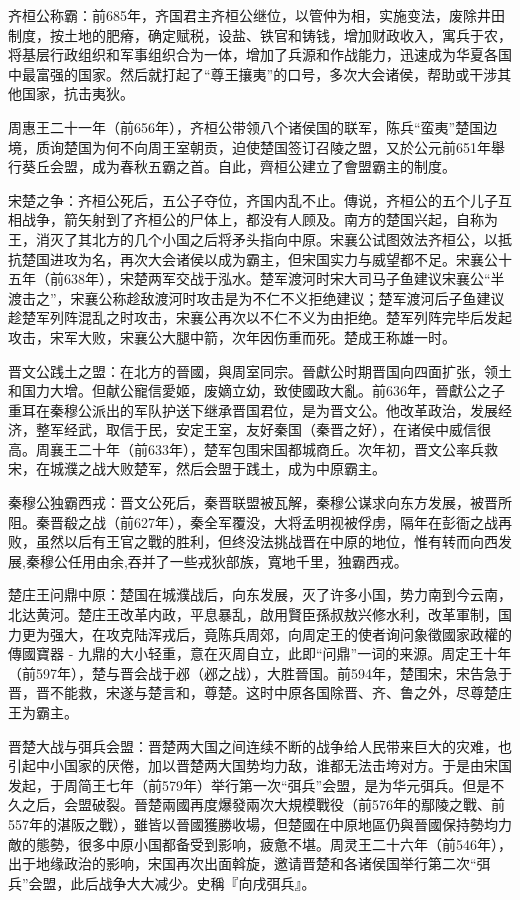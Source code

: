齐桓公称霸：前685年，齐国君主齐桓公继位，以管仲为相，实施变法，废除井田制度，按土地的肥瘠，确定赋税，设盐、铁官和铸钱，增加财政收入，寓兵于农，将基层行政组织和军事组织合为一体，增加了兵源和作战能力，迅速成为华夏各国中最富强的国家。然后就打起了“尊王攘夷”的口号，多次大会诸侯，帮助或干涉其他国家，抗击夷狄。

周惠王二十一年（前656年），齐桓公带领八个诸侯国的联军，陈兵“蛮夷”楚国边境，质询楚国为何不向周王室朝贡，迫使楚国签订召陵之盟，又於公元前651年舉行葵丘会盟，成为春秋五霸之首。自此，齊桓公建立了會盟霸主的制度。

宋楚之争：齐桓公死后，五公子夺位，齐国内乱不止。傳说，齐桓公的五个儿子互相战争，箭矢射到了齐桓公的尸体上，都没有人顾及。南方的楚国兴起，自称为王，消灭了其北方的几个小国之后将矛头指向中原。宋襄公试图效法齐桓公，以抵抗楚国进攻为名，再次大会诸侯以成为霸主，但宋国实力与威望都不足。宋襄公十五年（前638年），宋楚两军交战于泓水。楚军渡河时宋大司马子鱼建议宋襄公“半渡击之”，宋襄公称趁敌渡河时攻击是为不仁不义拒绝建议；楚军渡河后子鱼建议趁楚军列阵混乱之时攻击，宋襄公再次以不仁不义为由拒绝。楚军列阵完毕后发起攻击，宋军大败，宋襄公大腿中箭，次年因伤重而死。楚成王称雄一时。

晋文公践土之盟：在北方的晉國，與周室同宗。晉獻公时期晋国向四面扩张，领土和国力大增。但献公寵信愛姬，废嫡立幼，致使國政大亂。前636年，晉獻公之子重耳在秦穆公派出的军队护送下继承晋国君位，是为晋文公。他改革政治，发展经济，整军经武，取信于民，安定王室，友好秦国（秦晋之好），在诸侯中威信很高。周襄王二十年（前633年），楚军包围宋国都城商丘。次年初，晋文公率兵救宋，在城濮之战大败楚军，然后会盟于践土，成为中原霸主。

秦穆公独霸西戎：晋文公死后，秦晋联盟被瓦解，秦穆公谋求向东方发展，被晋所阻。秦晋殽之战（前627年），秦全军覆没，大将孟明视被俘虏，隔年在彭衙之战再败，虽然以后有王官之戰的胜利，但终没法挑战晋在中原的地位，惟有转而向西发展,秦穆公任用由余,吞并了一些戎狄部族，寬地千里，独霸西戎。

楚庄王问鼎中原：楚国在城濮战后，向东发展，灭了许多小国，势力南到今云南，北达黄河。楚庄王改革内政，平息暴乱，啟用賢臣孫叔敖兴修水利，改革軍制，国力更为强大，在攻克陆浑戎后，竟陈兵周郊，向周定王的使者询问象徵國家政權的傳國寶器 - 九鼎的大小轻重，意在灭周自立，此即“问鼎”一词的来源。周定王十年（前597年），楚与晋会战于邲（邲之战），大胜晉国。前594年，楚围宋，宋告急于晋，晋不能救，宋遂与楚言和，尊楚。这时中原各国除晋、齐、鲁之外，尽尊楚庄王为霸主。

晋楚大战与弭兵会盟：晋楚两大国之间连续不断的战争给人民带来巨大的灾难，也引起中小国家的厌倦，加以晋楚两大国势均力敌，谁都无法击垮对方。于是由宋国发起，于周简王七年（前579年）举行第一次“弭兵”会盟，是为华元弭兵。但是不久之后，会盟破裂。晉楚兩國再度爆發兩次大規模戰役（前576年的鄢陵之戰、前557年的湛阪之戰），雖皆以晉國獲勝收場，但楚國在中原地區仍與晉國保持勢均力敵的態勢，很多中原小国都备受到影响，疲惫不堪。周灵王二十六年（前546年），出于地缘政治的影响，宋国再次出面斡旋，邀请晋楚和各诸侯国举行第二次“弭兵”会盟，此后战争大大减少。史稱『向戌弭兵』。

